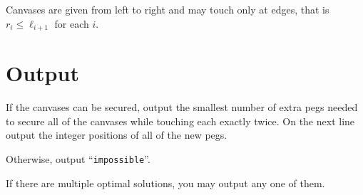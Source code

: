 Canvases are given from left to right and may touch only at edges,
that is $r_i \le \ell_{i+1}$ for each $i$.

\section*{Output}

If the canvases can be secured, output the smallest number of extra pegs needed
to secure all of the canvases while touching each exactly twice. On the next
line output the integer positions of all of the new pegs.

Otherwise, output ``\texttt{impossible}''.

If there are multiple optimal solutions, you may output any one of them.

